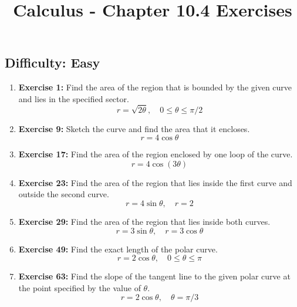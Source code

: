 \usepackage{amsmath}
\usepackage{amssymb}
\usepackage{kotex} %
\usepackage{geometry}
\geometry{a4paper, margin=1in}

\title{Calculus - Chapter 10.4 Exercises}
\author{}
\date{}


\maketitle
\hrulefill
\vspace{1em}

\subsection*{Difficulty: Easy}

\begin{enumerate}
    \item \textbf{Exercise 1:} Find the area of the region that is bounded by the given curve and lies in the specified sector.
    \[ r = \sqrt{2\theta}, \quad 0 \le \theta \le \pi/2 \]

    \item \textbf{Exercise 9:} Sketch the curve and find the area that it encloses.
    \[ r = 4\cos\theta \]

    \item \textbf{Exercise 17:} Find the area of the region enclosed by one loop of the curve.
    \[ r = 4\cos(3\theta) \]

    \item \textbf{Exercise 23:} Find the area of the region that lies inside the first curve and outside the second curve.
    \[ r = 4\sin\theta, \quad r = 2 \]

    \item \textbf{Exercise 29:} Find the area of the region that lies inside both curves.
    \[ r = 3\sin\theta, \quad r = 3\cos\theta \]

    \item \textbf{Exercise 49:} Find the exact length of the polar curve.
    \[ r = 2\cos\theta, \quad 0 \le \theta \le \pi \]

    \item \textbf{Exercise 63:} Find the slope of the tangent line to the given polar curve at the point specified by the value of $\theta$.
    \[ r = 2\cos\theta, \quad \theta = \pi/3 \]
\end{enumerate}

\hrulefill
\vspace{1em}

